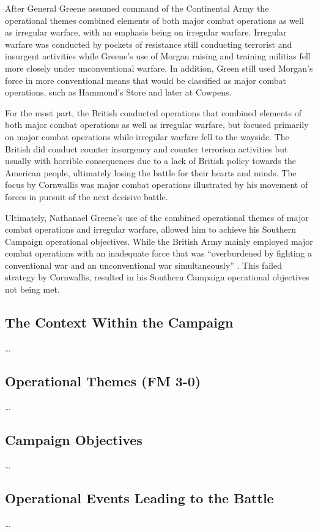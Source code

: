 After General Greene assumed command of the Continental Army the operational
themes combined elements of both major combat operations as well as irregular
warfare, with an emphasis being on irregular warfare.  Irregular warfare was
conducted by pockets of resistance still conducting terrorist and insurgent
activities while Greene's use of Morgan raising and training militias fell more
closely under unconventional warfare.  In addition, Green still used Morgan's
force in more conventional means that would be classified as major combat
operations, such as Hammond's Store and later at Cowpens.

For the most part, the British conducted operations that combined elements of
both major combat operations as well as irregular warfare, but focused
primarily on major combat operations while irregular warfare fell to the
wayside.  The British did conduct counter insurgency and counter terrorism
activities but usually with horrible consequences due to a lack of British
policy towards the American people, ultimately losing the battle for their
hearts and minds.  The focus by Cornwallis was major combat operations
illustrated by his movement of forces in pursuit of the next decisive battle.  

Ultimately, Nathanael Greene's use of the combined operational themes of major
combat operations and irregular warfare, allowed him to achieve his Southern
Campaign operational objectives.  While the British Army mainly employed major
combat operations with an inadequate force that was ``overburdened by fighting
a conventional war and an unconventional war simultaneously''
\cite[55]{woodward_comparative_2002}.  This failed strategy by Cornwallis,
resulted in his Southern Campaign operational objectives not being met.


\subsection{The Context Within the Campaign}

\ldots

\subsection{Operational Themes (FM 3-0)}

\ldots

\subsection{Campaign Objectives}

\ldots

\subsection{Operational Events Leading to the Battle}

\ldots





